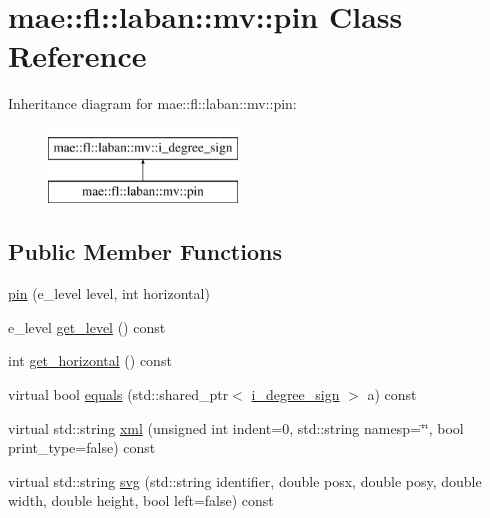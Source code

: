 \hypertarget{classmae_1_1fl_1_1laban_1_1mv_1_1pin}{\section{mae\-:\-:fl\-:\-:laban\-:\-:mv\-:\-:pin Class Reference}
\label{classmae_1_1fl_1_1laban_1_1mv_1_1pin}
}
Inheritance diagram for mae\-:\-:fl\-:\-:laban\-:\-:mv\-:\-:pin\-:\begin{figure}[H]
\begin{center}
\leavevmode
\includegraphics[height=2.000000cm]{classmae_1_1fl_1_1laban_1_1mv_1_1pin}
\end{center}
\end{figure}
\subsection*{Public Member Functions}
\begin{DoxyCompactItemize}
\item 
\hyperlink{classmae_1_1fl_1_1laban_1_1mv_1_1pin_a07a30c5fa556e83f4bf5884e35511ae4}{pin} (e\-\_\-level level, int horizontal)
\item 
e\-\_\-level \hyperlink{classmae_1_1fl_1_1laban_1_1mv_1_1pin_a2b6dd6bdc2a2642abf265bee1a111cf3}{get\-\_\-level} () const 
\item 
int \hyperlink{classmae_1_1fl_1_1laban_1_1mv_1_1pin_aa93e5de8f1ad1ab6fe87157a2d0906ce}{get\-\_\-horizontal} () const 
\item 
virtual bool \hyperlink{classmae_1_1fl_1_1laban_1_1mv_1_1pin_a49353682e373a913730f0556f8fe2963}{equals} (std\-::shared\-\_\-ptr$<$ \hyperlink{classmae_1_1fl_1_1laban_1_1mv_1_1i__degree__sign}{i\-\_\-degree\-\_\-sign} $>$ a) const 
\item 
virtual std\-::string \hyperlink{classmae_1_1fl_1_1laban_1_1mv_1_1pin_a1a253c5718b0f88e4ffb8bf06e8bff22}{xml} (unsigned int indent=0, std\-::string namesp=\char`\"{}\char`\"{}, bool print\-\_\-type=false) const 
\item 
virtual std\-::string \hyperlink{classmae_1_1fl_1_1laban_1_1mv_1_1pin_ae4af4900e50fc252ecd151da4ad2fe2a}{svg} (std\-::string identifier, double posx, double posy, double width, double height, bool left=false) const 
\end{DoxyCompactItemize}


